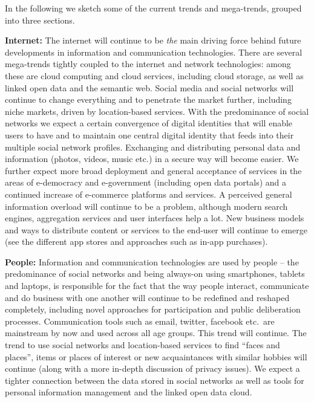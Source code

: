 \documentclass[10pt, plain]{../../metanetpaper}
\begin{document}
\begin{multicols}{2}
In the following we sketch some of the current trends and mega-trends, grouped into three sections.

\textbf{Internet:} The internet will continue to be \emph{the} main driving force behind future developments in information and communication technologies. There are several mega-trends tightly coupled to the internet and network technologies: among these are cloud computing and cloud services, including cloud storage, as well as linked open data and the semantic web. Social media and social networks will continue to change everything and to penetrate the market further, including niche markets, driven by location-based services. With the predominance of social networks we expect a certain convergence of digital identities that will enable users to have and to maintain one central digital identity that feeds into their multiple social network profiles. Exchanging and distributing personal data and information (photos, videos, music etc.) in a secure way will become easier. We further expect more broad deployment and general acceptance of services in the areas of e-democracy and e-government (including open data portals) and a continued increase of e-commerce platforms \cite{bruegel12} and services. A perceived general information overload will continue to be a problem, although modern search engines, aggregation services and user interfaces help a lot. New business models and ways to distribute content or services to the end-user will continue to emerge (see the different app stores and approaches such as in-app purchases).

\textbf{People:} Information and communication technologies are used by people -- the predominance of social networks and being always-on using smartphones, tablets and laptops, is responsible for the fact that the way people interact, communicate and do business with one another will continue to be redefined and reshaped completely, including novel approaches for participation and public deliberation processes. Communication tools such as email, twitter, facebook etc.~are mainstream by now and used across all age groups. This trend will continue. The trend to use social networks and location-based services to find ``faces and places'', items or places of interest or new acquaintances with similar hobbies will continue (along with a more in-depth discussion of privacy issues). We expect a tighter connection between the data stored in social networks as well as tools for personal information management and the linked open data cloud.


\end{multicols}
\end{document}
